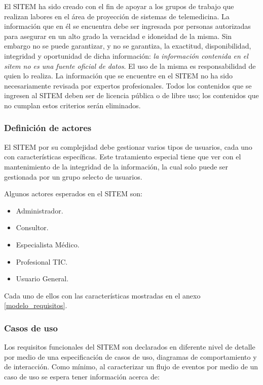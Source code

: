 El SITEM ha sido creado con el fin de apoyar a los grupos de trabajo que realizan labores en el área de proyección de sistemas de telemedicina. La información que en él se encuentra debe ser ingresada por personas autorizadas para asegurar en un alto grado la veracidad e idoneidad de la misma. Sin embargo no se puede garantizar, y no se garantiza, la exactitud, disponibilidad, integridad y oportunidad de dicha información: \textit{la información contenida en el sitem no es una fuente oficial de datos}. El uso de la misma es responsabilidad de quien lo realiza. La información que se encuentre en el SITEM no ha sido necesariamente revisada por expertos profesionales. Todos los contenidos que se ingresen al SITEM deben ser de licencia pública o de libre uso; los contenidos que no cumplan estos criterios serán eliminados.

\subsubsection{Definición de actores}

El SITEM por su complejidad debe gestionar varios tipos de usuarios, cada uno con características específicas. Este tratamiento especial tiene que ver con el mantenimiento de la integridad de la información, la cual solo puede ser gestionada por un grupo selecto de usuarios. 

Algunos actores esperados en el SITEM son:

\begin{itemize}
\item Administrador.
\item Consultor.
\item Especialista Médico.
\item Profesional TIC.
\item Usuario General.
\end{itemize}

Cada uno de ellos con las características mostradas en el anexo \ref{modelo_requisitos}.

\subsubsection{Casos de uso}

Los requisitos funcionales del SITEM son declarados en diferente nivel de detalle por medio de una especificación de casos de uso, diagramas de comportamiento y de interacción. Como mínimo, al caracterizar un flujo de eventos por medio de un caso de uso se espera tener información acerca de:

